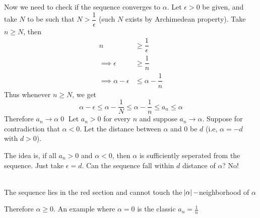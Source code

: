 Now we need to check if the sequence converges to $\alpha$. Let $\epsilon > 0$ be given, and take $N$ to be such that $N > \dfrac{1}{\epsilon}$ (such $N$ exists by Archimedean property). Take $n \geq N$, then
\begin{align*}
n &\geq \dfrac{1}{\epsilon}\\
\implies \epsilon &\geq \dfrac 1 n\\
\implies \alpha - \epsilon &\leq \alpha - \dfrac 1 n 
\end{align*}
Thus whenever $n \geq N$, we get
$$
\alpha - \epsilon \leq \alpha - \dfrac{1}{N} \leq \alpha - \dfrac{1}{n} \leq a_n \leq \alpha
$$
Therefore $a_n \rightarrow \alpha$\qed
\ans Let $a_n > 0$ for every $n$ and suppose $a_n \rightarrow \alpha$. Suppose for contradiction that $\alpha < 0$. Let the distance between $\alpha$ and $0$ be $d$ (i.e, $\alpha = -d$ with $d > 0$).

The idea is, if all $a_n > 0$ and $\alpha < 0$, then $\alpha$ is sufficiently seperated from the sequence. Just take $\epsilon = d$. Can the sequence fall within $d$ distance of $\alpha$? No!

\begin{center}
\\
The sequence lies in the red section and cannot touch the $\abs{\alpha}-$neighborhood of $\alpha$
\end{center}
Therefore $\alpha \geq 0$. An example where $\alpha = 0$ is the classic $a_n = \frac 1 n$

